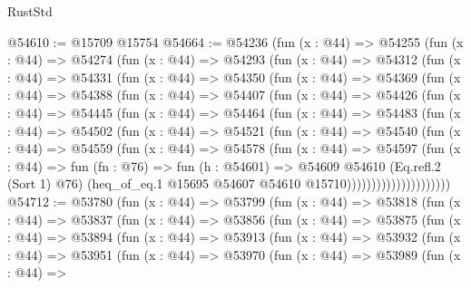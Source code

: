\begin{lexlean}{RustStd}
\begin{coremodule}
@54610 := @15709 @15754
@54664 := @54236
    (fun (x : @44) =>
    @54255
      (fun (x : @44) =>
      @54274
        (fun (x : @44) =>
        @54293
          (fun (x : @44) =>
          @54312
            (fun (x : @44) =>
            @54331
              (fun (x : @44) =>
              @54350
                (fun (x : @44) =>
                @54369
                  (fun (x : @44) =>
                  @54388
                    (fun (x : @44) =>
                    @54407
                      (fun (x : @44) =>
                      @54426
                        (fun (x : @44) =>
                        @54445
                          (fun (x : @44) =>
                          @54464
                            (fun (x : @44) =>
                            @54483
                              (fun (x : @44) =>
                              @54502
                                (fun (x : @44) =>
                                @54521
                                  (fun (x : @44) =>
                                  @54540
                                    (fun (x : @44) =>
                                    @54559
                                      (fun (x : @44) =>
                                      @54578
                                        (fun (x : @44) =>
                                        @54597
                                          (fun (x : @44) =>
                                          fun (fn : @76) =>
                                          fun (h : @54601) =>
                                          @54609
                                            @54610
                                            (Eq.refl.{2} (Sort 1) @76)
                                            (heq_of_eq.{1}
                                              @15695
                                              @54607
                                              @54610
                                              @15710)))))))))))))))))))))
@54712 := @53780
    (fun (x : @44) =>
    @53799
      (fun (x : @44) =>
      @53818
        (fun (x : @44) =>
        @53837
          (fun (x : @44) =>
          @53856
            (fun (x : @44) =>
            @53875
              (fun (x : @44) =>
              @53894
                (fun (x : @44) =>
                @53913
                  (fun (x : @44) =>
                  @53932
                    (fun (x : @44) =>
                    @53951
                      (fun (x : @44) =>
                      @53970
                        (fun (x : @44) =>
                        @53989
                          (fun (x : @44) =>

\end{coremodule}
\end{lexlean}
